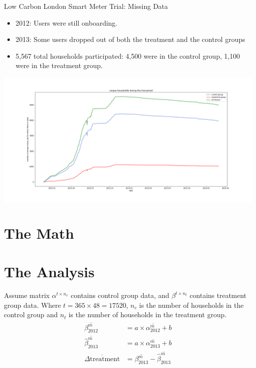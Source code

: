 \documentclass{beamer}
\begin{document}
\begin{frame}{Low Carbon London Smart Meter Trial: Missing Data}
  \begin{itemize}
    \item 2012: Users were still onboarding.
    \item 2013: Some users dropped out of both the treatment and the control groups
    \item 5,567 total households participated: 4,500 were in the control group, 1,100 were in the treatment group.
  \end{itemize}
  \vspace{-0.5cm}
  \includegraphics[width=1\textwidth]{images/house-count.png}
\end{frame}

\section{The Math}

\begin{frame}
  \begin{itemize}
    \item <+->
\end{frame}


\section{The Analysis}

\begin{frame}
  Assume matrix $\alpha^{t \times n_c}$ contains control group data, and $\beta^{t \times n_t}$ contains treatment group data. Where $t = 365 \times 48 = 17520$, $n_c$ is the number of households in the control group and $n_t$ is the number of households in the treatment group.
  \begin{align}
    \begin{split}
      \overline{\beta^m_{2012}} &= a \times \overline{\alpha^m_{2012}} + b \\
      \overline{\hat{\beta}^m_{2013}} &= a \times \overline{\alpha^m_{2013}} + b \\
      \overline{\Delta\mbox{treatment}} &= \overline{\beta^m_{2013}} - \overline{\hat{\beta}^m_{2013}}
    \end{split}
  \end{align}
\end{frame}
\end{document}
